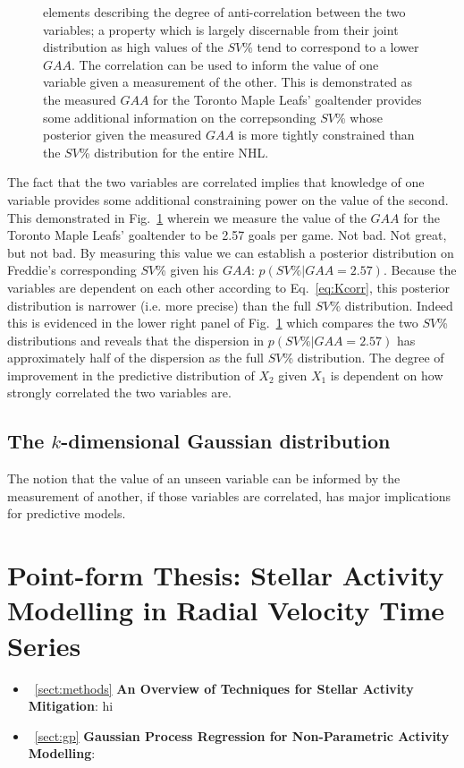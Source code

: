 \begin{figure}
{    elements describing the degree of anti-correlation between the two
    variables; a property which is largely discernable from their joint
    distribution as high values of the $SV$\% tend to correspond to a lower
    $GAA$. The correlation can be used to inform the value of one variable given a
    measurement of the other. This is demonstrated as the measured $GAA$ 
    for the Toronto Maple Leafs' goaltender 
    provides some
    additional information on the correpsonding $SV$\% whose posterior given the
    measured $GAA$ is more tightly constrained than the $SV$\% distribution for
    the entire NHL.}
  \label{fig:corr2d}
\end{figure}

The fact that the two variables are
correlated implies that knowledge of one variable provides some additional constraining
power on the value of the second. This demonstrated in Fig.~\ref{fig:corr2d}
wherein we measure the value of the $GAA$ for the Toronto Maple Leafs' goaltender
to be 2.57 goals per game. Not bad. Not great, but not bad. By measuring
this value we can establish a posterior distribution on Freddie's corresponding
$SV$\% given his $GAA$: $p(SV\%|GAA=2.57)$. Because the variables are dependent
on each other according to Eq.~\ref{eq:Kcorr}, this posterior distribution is
narrower (i.e. more precise) than the full $SV$\% distribution. Indeed this is
evidenced in the lower right panel of Fig.~\ref{fig:corr2d} which compares the
two $SV$\% distributions and reveals that the dispersion in $p(SV\%|GAA=2.57)$
has approximately half of the dispersion as the full $SV$\% distribution. The degree
of improvement in the predictive distribution of $X_2$ given $X_1$ is dependent
on how strongly correlated the two variables are. \\

\subsection{The $k$-dimensional Gaussian distribution}
The notion that the value of an unseen variable can be informed by the measurement
of another, if those variables are correlated, has major implications for
predictive models. 


\section{Point-form Thesis: Stellar Activity Modelling in Radial Velocity
  Time Series}
\begin{itemize}
\renewcommand\labelitemi{--}
\item~\ref{sect:methods} \textbf{An Overview of Techniques for Stellar Activity
Mitigation}: hi \\
\item~\ref{sect:gp} \textbf{Gaussian Process Regression for Non-Parametric
  Activity Modelling}:
\end{itemize}
